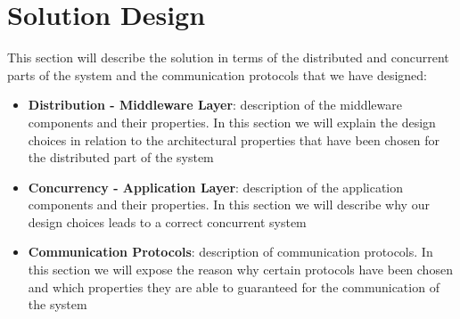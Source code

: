\section{Solution Design}

This section will describe the solution in terms of the distributed and concurrent parts of the system and the communication protocols that we have designed:

\begin{itemize}
\item \textbf{Distribution - Middleware Layer}: 
	description of the middleware components and their properties. In this section we will explain the design choices in relation to the architectural properties that have been chosen 
	for the distributed part of the system
\item \textbf{Concurrency - Application Layer}: 
	description of the application components and their properties. In this section we will describe why our design choices leads to a correct concurrent system 
\item \textbf{Communication Protocols}: 
	description of communication protocols. In this section we will expose the reason why certain protocols have been chosen and which properties they are able to guaranteed for 
	the communication of the system
\end{itemize}








